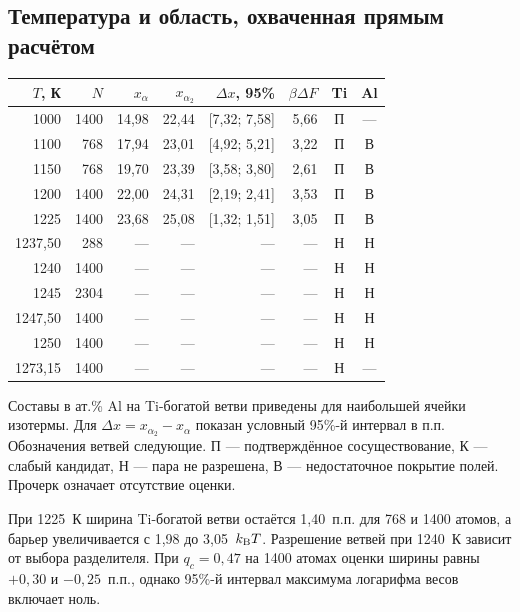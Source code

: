 \documentclass[11pt,a4paper]{article}
\renewcommand{\arraystretch}{1.18}\raggedbottom\pagestyle{fancy}\fancyhf{}
\begin{document}
\subsection*{Температура и область, охваченная прямым расчётом}
\begin{center}\small\renewcommand{\arraystretch}{1.08}\setlength{\tabcolsep}{3.3pt}\begin{tabular}{@{}rrrrrrcc@{}}\toprule
\(T\), К & \(N\) & \(x_\alpha\) & \(x_{\alpha_2}\) & \(\Delta x\), 95\% & \(\beta\Delta F\) & Ti & Al\\\midrule
1000 & 1400 & 14,98 & 22,44 & [7,32; 7,58] & 5,66 & П & ---\\
1100 & 768 & 17,94 & 23,01 & [4,92; 5,21] & 3,22 & П & В\\
1150 & 768 & 19,70 & 23,39 & [3,58; 3,80] & 2,61 & П & В\\
1200 & 1400 & 22,00 & 24,31 & [2,19; 2,41] & 3,53 & П & В\\
1225 & 1400 & 23,68 & 25,08 & [1,32; 1,51] & 3,05 & П & В\\
1237,50 & 288 & --- & --- & --- & --- & Н & Н\\
1240 & 1400 & --- & --- & --- & --- & Н & Н\\
1245 & 2304 & --- & --- & --- & --- & Н & Н\\
1247,50 & 1400 & --- & --- & --- & --- & Н & Н\\
1250 & 1400 & --- & --- & --- & --- & Н & Н\\
1273,15 & 1400 & --- & --- & --- & --- & Н & ---\\
\bottomrule\end{tabular}\end{center}
{\small Составы в ат.\% Al на Ti-богатой ветви приведены для наибольшей ячейки изотермы. Для \(\Delta x=x_{\alpha_2}-x_\alpha\) показан условный 95\%-й интервал в п.п. Обозначения ветвей следующие. П --- подтверждённое сосуществование, К --- слабый кандидат, Н --- пара не разрешена, В --- недостаточное покрытие полей. Прочерк означает отсутствие оценки.}\par
При 1225~К ширина Ti-богатой ветви остаётся 1,40~п.п. для 768 и 1400 атомов, а барьер увеличивается с 1,98 до 3,05~\(k_{\rm B}T\). Разрешение ветвей при 1240~К зависит от выбора разделителя. При \(q_c=0{,}47\) на 1400 атомах оценки ширины равны \(+0{,}30\) и \(-0{,}25\)~п.п., однако 95\%-й интервал максимума логарифма весов включает ноль.
\end{document}
